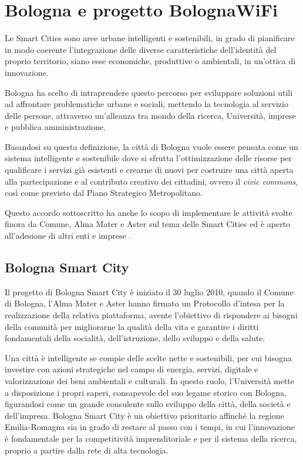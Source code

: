 

\section{Bologna e progetto BolognaWiFi}  %
Le Smart Cities sono aree urbane intelligenti e sostenibili, in grado di pianificare in modo coerente l'integrazione delle diverse caratteristiche dell'identità del proprio territorio, siano esse economiche, produttive o ambientali, in un'ottica di innovazione.

Bologna ha scelto di intraprendere questo percorso per sviluppare soluzioni utili ad affrontare problematiche urbane e sociali, mettendo la tecnologia al servizio delle persone, attraverso un'alleanza tra mondo della ricerca, Università, imprese e pubblica amministrazione.

Basandosi su questa definizione, la città di Bologna vuole essere pensata come un sistema intelligente e sostenibile dove si sfrutta l'ottimizzazione delle risorse per qualificare i servizi già esistenti e crearne di nuovi per costruire una città aperta alla partecipazione e al contributo creativo dei cittadini, ovvero il \textit{civic commons}, così come previsto dal Piano Strategico Metropolitano.

Questo accordo sottoscritto ha anche lo scopo di implementare le attività svolte finora da Comune, Alma Mater e Aster sul tema delle Smart Cities ed è aperto all'adesione di altri enti e imprese \cite{Bologna_Smart_City}.

\subsection{Bologna Smart City}
Il progetto di Bologna Smart City è iniziato il 30 luglio 2010, quando il Comune di Bologna, l'Alma Mater e Aster hanno firmato un Protocollo d'intesa per la realizzazione della relativa piattaforma, avente l'obiettivo di rispondere ai bisogni della comunità per migliorarne la qualità della vita e garantire i diritti fondamentali della socialità, dell'istruzione, dello sviluppo e della salute.

Una città è intelligente se compie delle scelte nette e sostenibili, per cui bisogna investire con azioni strategiche nel campo di energia, servizi, digitale e valorizzazione dei beni ambientali e culturali. In questo ruolo, l'Università mette a disposizione i propri saperi, consapevole del suo legame storico con Bologna, figurandosi come un grande consulente sullo sviluppo della città, della società e dell'impresa. Bologna Smart City è un obiettivo prioritario affinché la regione Emilia-Romagna sia in grado di restare al passo con i tempi, in cui l'innovazione è fondamentale per la competitività imprenditoriale e per il sistema della ricerca, proprio a partire dalla rete di alta tecnologia.

